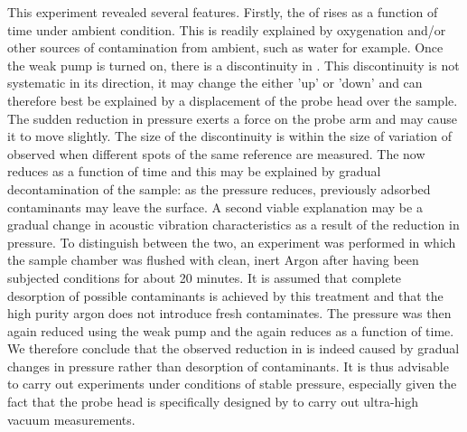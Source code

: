 This experiment revealed several features. Firstly, the \cpd{} of \hopg{} rises as a function of time under ambient condition. This is readily explained by oxygenation and/or other sources of contamination from ambient, such as water for example. Once the weak pump is turned on, there is a discontinuity in \cpd{}. This discontinuity is not systematic in its direction, it may change the \cpd{} either 'up' or 'down' and can therefore best be explained by a displacement of the probe head over the sample. The sudden reduction in pressure exerts a force on the probe arm and may cause it to move slightly. The size of the discontinuity is within the size of variation of \cpd{} observed when different spots of the same reference are measured. The \cpd{} now reduces as a function of time and this may be explained by gradual decontamination of the sample: as the pressure reduces, previously adsorbed contaminants may leave the surface. A second viable explanation may be a gradual change in acoustic vibration characteristics as a result of the reduction in pressure. To distinguish between the two, an experiment was performed in which the sample chamber was flushed with clean, inert Argon after having been subjected \uhv{} conditions for about 20 minutes. It is assumed that complete desorption of possible contaminants is achieved by this treatment and that the high purity argon does not introduce fresh contaminates. The pressure was then again reduced using the weak pump and the \cpd{} again reduces as a function of time. We therefore conclude that the observed reduction in \cpd{} is indeed caused by gradual changes in pressure rather than desorption of contaminants. It is thus advisable to carry out \cpd{} experiments under conditions of stable pressure, especially given the fact that the probe head is specifically designed by \McA{} to carry out ultra-high vacuum \cpd{} measurements. 
